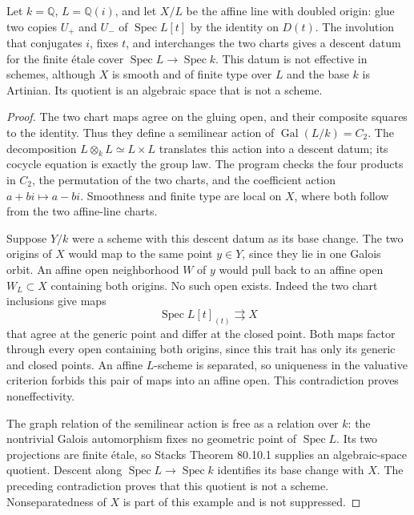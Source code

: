 \begin{proposition}\label{B:descent-counterexample}
Let $k=\mathbb Q$, $L=\mathbb Q(i)$, and let $X/L$ be the affine line with doubled origin: glue two copies $U_+$ and $U_-$ of $\operatorname{Spec}L[t]$ by the identity on $D(t)$. The involution that conjugates $i$, fixes $t$, and interchanges the two charts gives a descent datum for the finite \'etale cover $\operatorname{Spec}L\to\operatorname{Spec}k$. This datum is not effective in schemes, although $X$ is smooth and of finite type over $L$ and the base $k$ is Artinian. Its quotient is an algebraic space that is not a scheme.
\end{proposition}
\begin{proof}
The two chart maps agree on the gluing open, and their composite squares to the identity. Thus they define a semilinear action of $\operatorname{Gal}(L/k)=C_2$. The decomposition $L\otimes_kL\simeq L\times L$ translates this action into a descent datum; its cocycle equation is exactly the group law. The program checks the four products in $C_2$, the permutation of the two charts, and the coefficient action $a+bi\mapsto a-bi$. Smoothness and finite type are local on $X$, where both follow from the two affine-line charts.

Suppose $Y/k$ were a scheme with this descent datum as its base change. The two origins of $X$ would map to the same point $y\in Y$, since they lie in one Galois orbit. An affine open neighborhood $W$ of $y$ would pull back to an affine open $W_L\subset X$ containing both origins. No such open exists. Indeed the two chart inclusions give maps
\[
 \operatorname{Spec}L[t]_{(t)}\rightrightarrows X
\]
that agree at the generic point and differ at the closed point. Both maps factor through every open containing both origins, since this trait has only its generic and closed points. An affine $L$-scheme is separated, so uniqueness in the valuative criterion forbids this pair of maps into an affine open. This contradiction proves noneffectivity.

The graph relation of the semilinear action is free as a relation over $k$: the nontrivial Galois automorphism fixes no geometric point of $\operatorname{Spec}L$. Its two projections are finite \'etale, so Stacks Theorem 80.10.1 supplies an algebraic-space quotient. Descent along $\operatorname{Spec}L\to\operatorname{Spec}k$ identifies its base change with $X$. The preceding contradiction proves that this quotient is not a scheme. Nonseparatedness of $X$ is part of this example and is not suppressed.
\end{proof}

